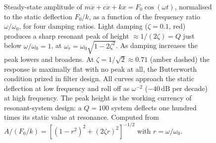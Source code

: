 \begin{figure}[htbp]
\centering
{}
\caption[Resonance: frequency response of the forced
oscillator]{Steady-state amplitude of $m\ddot{x}+c\dot{x}+kx=F_{0}
\cos(\omega t)$, normalised to the static deflection $F_{0}/k$, as a
function of the frequency ratio $\omega/\omega_{0}$, for four damping
ratios. Light damping ($\zeta=0.1$, red) produces a sharp resonant
peak of height $\approx 1/(2\zeta)=Q$ just below $\omega/\omega_{0}=1$,
at $\omega_{r}=\omega_{0}\sqrt{1-2\zeta^{2}}$. As damping increases
the peak lowers and broadens. At $\zeta=1/\sqrt{2}\approx 0.71$
(amber dashed) the response is maximally flat with no peak at all,
the Butterworth condition prized in filter design. All curves
approach the static deflection at low frequency and roll off as
$\omega^{-2}$ ($-40\,\text{dB}$ per decade) at high frequency. The
peak height is the working currency of resonant-system design: a
$Q=100$ system deflects one hundred times its static value at
resonance. Computed from
$A/(F_{0}/k)=[(1-r^{2})^{2}+(2\zeta r)^{2}]^{-1/2}$ with
$r=\omega/\omega_{0}$.}
\label{fig:vol02:ch07:resonance}
\end{figure}
